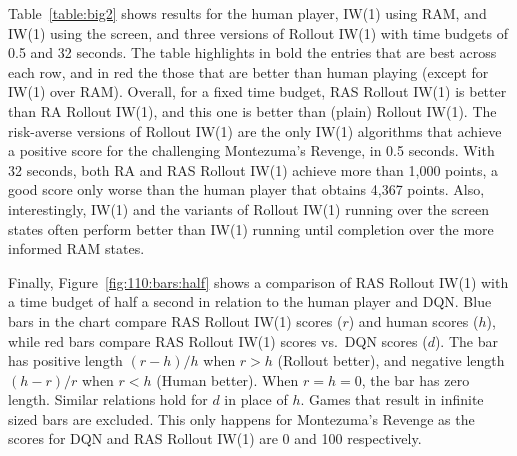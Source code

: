 \documentclass[letterpaper]{article}
\begin{document}
Table~\ref{table:big2} shows results for the human player, IW(1) using RAM, and
IW(1) using the screen, and three versions of Rollout IW(1) with time budgets
of 0.5 and 32 seconds. The table highlights in bold the entries that are best
across each row, and in red the those that are better than human playing (except
for IW(1) over RAM).
Overall, for a fixed time budget, RAS Rollout IW(1) is better than RA Rollout IW(1),
and this one is better than (plain) Rollout IW(1).
The risk-averse versions of Rollout IW(1) are the only IW(1) algorithms that
achieve a positive score for the challenging Montezuma's Revenge, in 0.5 seconds.
With 32 seconds, both RA and RAS Rollout IW(1) achieve more than 1,000 points,
a good score only worse than the human player that obtains 4,367 points.
Also, interestingly, IW(1) and the variants of Rollout IW(1) running over
the screen states often perform better than IW(1) running until completion over
the more informed RAM states.

Finally, Figure~\ref{fig:110:bars:half} shows a comparison of RAS Rollout IW(1)
with a time budget of half a second in relation to the human player and DQN.
Blue bars in the chart compare RAS Rollout IW(1) scores ($r$) and human scores
($h$), while red bars compare RAS Rollout IW(1) scores vs.\ DQN scores ($d$). 
The bar has positive length $(r-h)/h$ when $r>h$ (Rollout better), and negative
length $(h-r)/r$ when $r<h$ (Human better).  When $r=h=0$, the bar has zero length.
Similar relations hold for $d$ in place of $h$. 
Games that result in infinite sized bars are excluded. This only happens for
Montezuma's Revenge as the scores for DQN and RAS Rollout IW(1) are
0 and 100 respectively.
\end{document}
